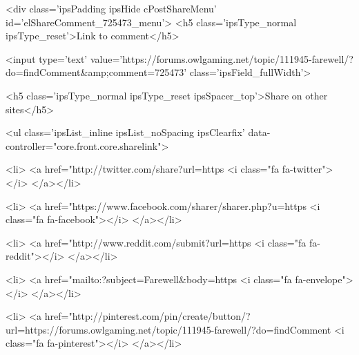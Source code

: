 	

	



<div class='ipsPadding ipsHide cPostShareMenu' id='elShareComment_725473_menu'>
	<h5 class='ipsType_normal ipsType_reset'>Link to comment</h5>
	
		
	
	
	<input type='text' value='https://forums.owlgaming.net/topic/111945-farewell/?do=findComment&amp;comment=725473' class='ipsField_fullWidth'>

	
	<h5 class='ipsType_normal ipsType_reset ipsSpacer_top'>Share on other sites</h5>
	

	<ul class='ipsList_inline ipsList_noSpacing ipsClearfix' data-controller="core.front.core.sharelink">
		
			<li>
<a href="http://twitter.com/share?url=https%
	<i class="fa fa-twitter"></i>
</a></li>
		
			<li>
<a href="https://www.facebook.com/sharer/sharer.php?u=https%
	<i class="fa fa-facebook"></i>
</a></li>
		
			<li>
<a href="http://www.reddit.com/submit?url=https%
	<i class="fa fa-reddit"></i>
</a></li>
		
			<li>
<a href="mailto:?subject=Farewell&body=https%
	<i class="fa fa-envelope"></i>
</a></li>
		
			<li>
<a href="http://pinterest.com/pin/create/button/?url=https://forums.owlgaming.net/topic/111945-farewell/?do=findComment%
	<i class="fa fa-pinterest"></i>
</a></li>
		
